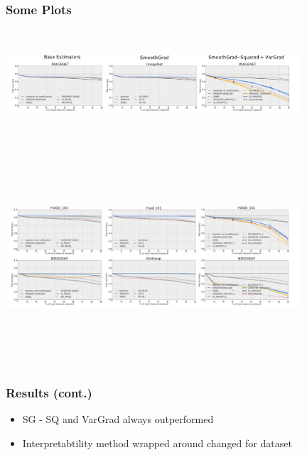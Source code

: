 \documentclass{beamer}
\theoremstyle{mystyle}
\begin{document}
\begin{frame}
	\frametitle{Some Plots}
	\includegraphics[width=11cm, height=4cm]{ImgNetSG.png}

\end{frame}
\begin{frame}
	\includegraphics[width=11cm, height=8cm]{other2SG.png}
\end{frame}
\begin{frame}
	\frametitle{Results (cont.)}
	\begin{itemize}
	\item SG - SQ and VarGrad always outperformed  \pause
	\item Interpretabtility method wrapped around changed for dataset
	\end{itemize}
\end{frame}
\end{document}
